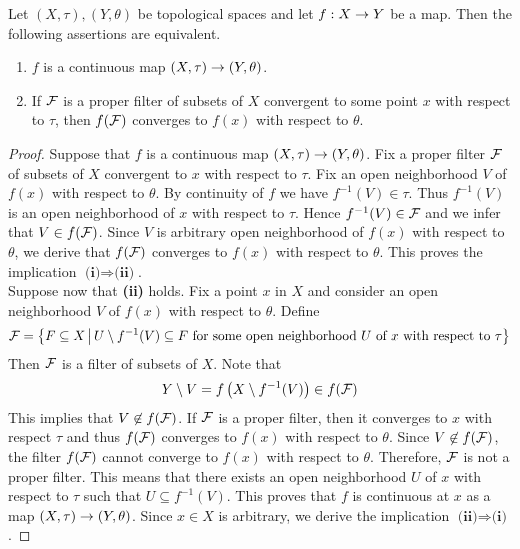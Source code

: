 \begin{proposition}\label{proposition:characterization_of_continuous_maps_in_terms_of_filters}
Let $(X,\tau),(Y,\theta)$ be topological spaces and let $f:X\rightarrow Y$ be a map. Then the following assertions are equivalent.
\begin{enumerate}[label=\emph{\textbf{(\roman*)}}, leftmargin=*]
\item $f$ is a continuous map $\left(X,\tau\right)\rightarrow \left(Y,\theta\right)$.
\item If ${\mathcal F}$ is a proper filter of subsets of $X$ convergent to some point $x$ with respect to $\tau$, then $f({\mathcal F})$ converges to $f(x)$ with respect to $\theta$.
\end{enumerate}
\end{proposition}
\begin{proof}
Suppose that $f$ is a continuous map $\left(X,\tau\right)\rightarrow \left(Y,\theta\right)$. Fix a proper filter ${\mathcal F}$ of subsets of $X$ convergent to $x$ with respect to $\tau$. Fix an open neighborhood $V$ of $f(x)$ with respect to $\theta$. By continuity of $f$ we have $f^{-1}(V) \in \tau$. Thus $f^{-1}(V)$ is an open neighborhood of $x$ with respect to $\tau$. Hence $f^{-1}(V) \in {\mathcal F}$ and we infer that $V \in f({\mathcal F})$. Since $V$ is arbitrary open neighborhood of $f(x)$ with respect to $\theta$, we derive that $f({\mathcal F})$ converges to $f(x)$ with respect to $\theta$. This proves the implication $\textbf{(i)}\Rightarrow \textbf{(ii)}$.\\
Suppose now that \textbf{(ii)} holds. Fix a point $x$ in $X$ and consider an open neighborhood $V$ of $f(x)$ with respect to $\theta$. Define
$${\mathcal F} = \big\{F\subseteq X\,\big|\,U\setminus f^{-1}(V)\subseteq F\mbox{ for some open neighborhood }U\mbox{ of }x\mbox{ with respect to }\tau\big\}$$
Then ${\mathcal F}$ is a filter of subsets of $X$. Note that
$$Y\setminus V = f\left(X\setminus f^{-1}(V)\right) \in f({\mathcal F})$$
This implies that $V \not \in f({\mathcal F})$. If ${\mathcal F}$ is a proper filter, then it converges to $x$ with respect $\tau$ and thus $f({\mathcal F})$ converges to $f(x)$ with respect to $\theta$. Since $V \not \in f({\mathcal F})$, the filter $f({\mathcal F})$ cannot converge to $f(x)$ with respect to $\theta$. Therefore, ${\mathcal F}$ is not a proper filter. This means that there exists an open neighborhood $U$ of $x$ with respect to $\tau$ such that $U \subseteq f^{-1}(V)$. This proves that $f$ is continuous at $x$ as a map $\left(X,\tau\right)\rightarrow \left(Y,\theta\right)$. Since $x\in X$ is arbitrary, we derive the implication $\textbf{(ii)}\Rightarrow \textbf{(i)}$.
\end{proof}













\small



